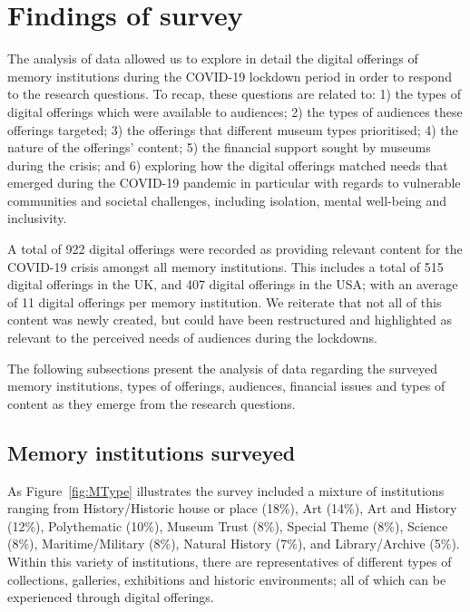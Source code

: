 \documentclass{egpubl}
\begin{document}
\section{Findings of survey}
\label{find}
The analysis of data allowed us to explore in detail the digital offerings of memory institutions during the COVID-19 lockdown period in order to respond to the research questions. To recap, these questions are related to: 1) the types of digital offerings which were available to audiences; 2) the types of audiences these offerings targeted; 3) the offerings that different museum types prioritised; 4) the nature of the offerings' content; 5) the financial support sought by museums during the crisis; and 6) exploring how the digital offerings matched needs that emerged during the COVID-19 pandemic in particular with regards to vulnerable communities and societal challenges, including isolation, mental well-being and inclusivity. 

A total of 922 digital offerings were recorded as providing relevant content for the COVID-19 crisis amongst all memory institutions. This includes a total of 515 digital offerings in the UK, and 407 digital offerings in the USA; with an average of 11 digital offerings per memory institution. We reiterate that not all of this content was newly created, but could have been restructured and highlighted as relevant to the perceived needs of audiences during the lockdowns. 

The following subsections present the analysis of data regarding the surveyed memory institutions, types of offerings, audiences, financial issues and types of content as they emerge from the research questions.

\subsection{Memory institutions surveyed}
\label{inst}
As Figure~\ref{fig:MType} illustrates the survey included a mixture of institutions ranging from History/Historic house or place (18\%), Art (14\%), Art and History (12\%), Polythematic (10\%), Museum Trust (8\%), Special Theme (8\%), Science (8\%), Maritime/Military (8\%), Natural History (7\%), and Library/Archive (5\%). Within this variety of institutions, there are representatives of different types of collections, galleries, exhibitions and historic environments; all of which can be experienced through digital offerings. 
\end{document}
